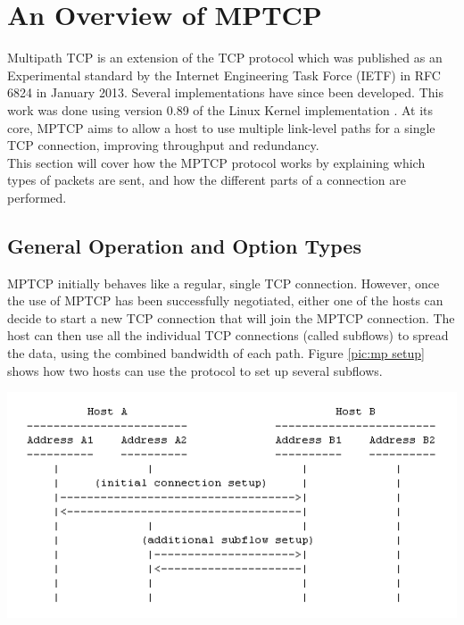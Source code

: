

\chapter{An Overview of MPTCP} \label{chap:mptcp}
Multipath TCP is an extension of the TCP protocol which was published as an Experimental standard by the Internet Engineering Task Force (IETF) in RFC 6824 \cite{rfc6824} in January 2013. Several implementations have since been developed. This work was done using version 0.89 of the Linux Kernel implementation \cite{mptcp}. At its core, MPTCP aims to allow a host to use multiple link-level paths for a single TCP connection, improving throughput and redundancy.\\

This section will cover how the MPTCP protocol works by explaining which types of packets are sent, and how the different parts of a connection are performed.

\section{General Operation and Option Types}
MPTCP initially behaves like a regular, single TCP connection. However, once the use of MPTCP has been successfully negotiated, either one of the hosts can decide to start a new TCP connection that will join the MPTCP connection. The host can then use all the individual TCP connections (called subflows) to spread the data, using the combined bandwidth of each path. Figure \ref{pic:mp setup} shows how two hosts can use the protocol to set up several subflows.\\

\begin{minipage}[c]{\textwidth}
\centering
\includegraphics[scale=0.6]{Figures/mptcpsetup.png}
\label{pic:mp setup}
\end{minipage} \\

